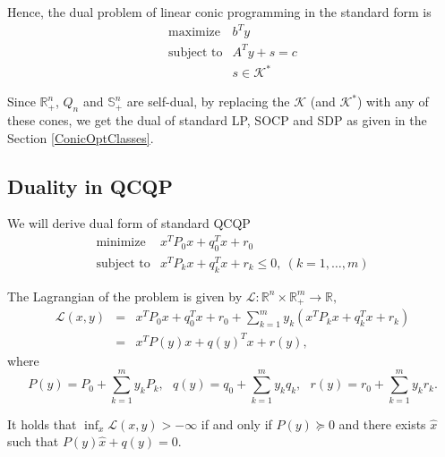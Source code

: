 \documentclass[10pt,oneside]{book}
\theoremstyle{definition}
\begin{document}
Hence, the dual problem of linear conic programming in the standard form is 
\begin{equation}
 \begin{array}{ll}
\mbox{maximize} & b^Ty\\
\mbox{subject to}& A^Ty + s = c\\
& s \in \mathcal{K}^*
\end{array}
\end{equation}

Since $\mathbb{R}^n_+$, $Q_n$ and $\mathbb{S}^n_+$ are self-dual, by replacing the $\mathcal{K}$ (and $\mathcal{K}^*$) with any of these cones, we get 
the dual of standard LP, SOCP and SDP as given in the Section \ref{ConicOptClasses}.



\subsection{Duality in QCQP}

We will derive dual form of standard QCQP
\begin{equation}
\begin{array}{ll}
\mbox{minimize}& x^TP_0x + q_0^Tx + r_0 \\
\mbox{subject to}& x^TP_kx + q_k^Tx + r_k \leq 0, \  (k = 1,\dots ,m)
\end{array} 
\end{equation}

The Lagrangian of the problem is given by $\mathcal{L}: \mathbb{R}^n\times\mathbb{R}^m_+ \rightarrow \mathbb{R},$
\begin{eqnarray}
\mathcal{L}(x,y) &=&  x^TP_0x + q_0^Tx + r_0 + \sum_{k=1}^m y_k(x^TP_kx + q_k^Tx + r_k) \\
 &=& x^TP(y)x + q(y)^Tx + r(y),
\end{eqnarray}
where %
\begin{equation} 
P(y) = P_0 + \sum_{k = 1}^m y_kP_k, \ \ \  q(y) = q_0 + \sum_{k = 1}^m y_kq_k, \ \ \ r(y) = r_0 + \sum_{k =1}^m y_kr_k. 
\end{equation}

It holds that $\inf_x\mathcal{L}(x,y) > -\infty$ if and only if $P(y)\succeq 0$ and there exists $\hat{x}$ such that  $P(y)\hat{x} + q(y) = 0.$
\end{document}
